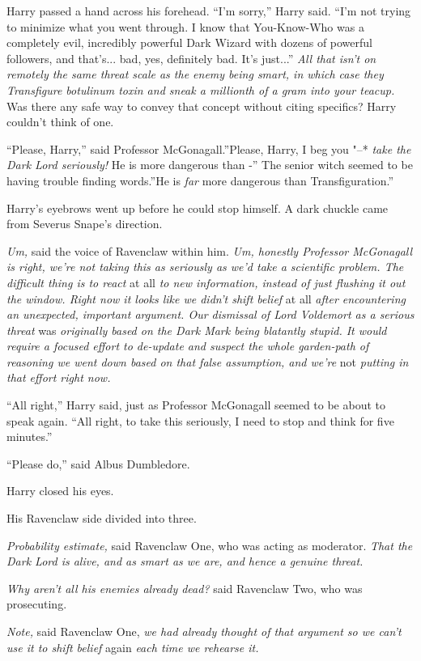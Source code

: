 Harry passed a hand across his forehead. ``I'm sorry,'' Harry said.
``I'm not trying to minimize what you went through. I know that
You-Know-Who was a completely evil, incredibly powerful Dark Wizard with
dozens of powerful followers, and that's... bad, yes, definitely
bad. It's just...'' \emph{All that isn't on remotely the same
threat scale as the enemy being smart, in which case they Transfigure
botulinum toxin and sneak a millionth of a gram into your teacup.} Was
there any safe way to convey that concept without citing specifics?
Harry couldn't think of one.

``Please, Harry,'' said Professor McGonagall.''Please, Harry, I beg you
"--* \emph{take the Dark Lord seriously!} He is more dangerous than -'' The
senior witch seemed to be having trouble finding words.''He is
\emph{far} more dangerous than Transfiguration.''

Harry's eyebrows went up before he could stop himself. A dark chuckle
came from Severus Snape's direction.

\emph{Um,} said the voice of Ravenclaw within him. \emph{Um, honestly
Professor McGonagall is right, we're not taking this as seriously as
we'd take a scientific problem. The difficult thing is to react} at all
\emph{to new information, instead of just flushing it out the window.
Right now it looks like we didn't shift belief} at all \emph{after
encountering an unexpected, important argument. Our dismissal of Lord
Voldemort as a serious threat} was \emph{originally based on the Dark
Mark being blatantly stupid. It would require a focused effort to
de-update and suspect the whole garden-path of reasoning we went down
based on that false assumption, and we're} not \emph{putting in that
effort right now.}

``All right,'' Harry said, just as Professor McGonagall seemed to be
about to speak again. ``All right, to take this seriously, I need to
stop and think for five minutes.''

``Please do,'' said Albus Dumbledore.

Harry closed his eyes.

His Ravenclaw side divided into three.

\emph{Probability estimate,} said Ravenclaw One, who was acting as
moderator. \emph{That the Dark Lord is alive, and as smart as we are,
and hence a genuine threat.}

\emph{Why aren't all his enemies already dead?} said Ravenclaw Two, who
was prosecuting.

\emph{Note,} said Ravenclaw One, \emph{we had already thought of that
argument so we can't use it to shift belief} again \emph{each time we
rehearse it.}

